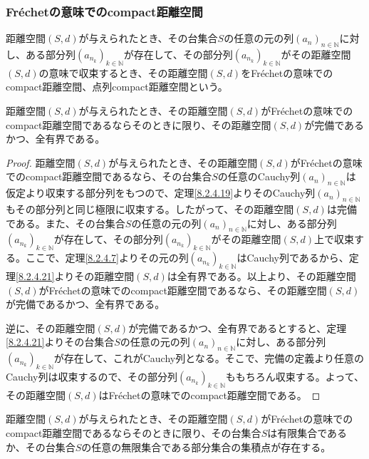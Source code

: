 \documentclass[dvipdfmx]{jsarticle}
\begin{document}
\subsubsection{Fréchetの意味でのcompact距離空間}%
\begin{dfn}
距離空間$(S,d)$が与えられたとき、その台集合$S$の任意の元の列$\left( a_{n} \right)_{n \in \mathbb{N}}$に対し、ある部分列$\left( a_{n_{k}} \right)_{k \in \mathbb{N}}$が存在して、その部分列$\left( a_{n_{k}} \right)_{k \in \mathbb{N}}$がその距離空間$(S,d)$の意味で収束するとき、その距離空間$(S,d)$をFréchetの意味でのcompact距離空間、点列compact距離空間という。
\end{dfn}
\begin{thm}\label{8.2.5.12}
距離空間$(S,d)$が与えられたとき、その距離空間$(S,d)$がFréchetの意味でのcompact距離空間であるならそのときに限り、その距離空間$(S,d)$が完備であるかつ、全有界である。
\end{thm}
\begin{proof}
距離空間$(S,d)$が与えられたとき、その距離空間$(S,d)$がFréchetの意味でのcompact距離空間であるなら、その台集合$S$の任意のCauchy列$\left( a_{n} \right)_{n \in \mathbb{N}}$は仮定より収束する部分列をもつので、定理\ref{8.2.4.19}よりそのCauchy列$\left( a_{n} \right)_{n \in \mathbb{N}}$もその部分列と同じ極限に収束する。したがって、その距離空間$(S,d)$は完備である。また、その台集合$S$の任意の元の列$\left( a_{n} \right)_{n \in \mathbb{N}}$に対し、ある部分列$\left( a_{n_{k}} \right)_{k \in \mathbb{N}}$が存在して、その部分列$\left( a_{n_{k}} \right)_{k \in \mathbb{N}}$がその距離空間$(S,d)$上で収束する。ここで、定理\ref{8.2.4.7}よりその元の列$\left( a_{n_{k}} \right)_{k \in \mathbb{N}}$はCauchy列であるから、定理\ref{8.2.4.21}よりその距離空間$(S,d)$は全有界である。以上より、その距離空間$(S,d)$がFréchetの意味でのcompact距離空間であるなら、その距離空間$(S,d)$が完備であるかつ、全有界である。\par
逆に、その距離空間$(S,d)$が完備であるかつ、全有界であるとすると、定理\ref{8.2.4.21}よりその台集合$S$の任意の元の列$\left( a_{n} \right)_{n \in \mathbb{N}}$に対し、ある部分列$\left( a_{n_{k}} \right)_{k \in \mathbb{N}}$が存在して、これがCauchy列となる。そこで、完備の定義より任意のCauchy列は収束するので、その部分列$\left( a_{n_{k}} \right)_{k \in \mathbb{N}}$ももちろん収束する。よって、その距離空間$(S,d)$はFréchetの意味でのcompact距離空間である。
\end{proof}
\begin{thm}\label{8.2.5.13}
距離空間$(S,d)$が与えられたとき、その距離空間$(S,d)$がFréchetの意味でのcompact距離空間であるならそのときに限り、その台集合$S$は有限集合であるか、その台集合$S$の任意の無限集合である部分集合の集積点が存在する。
\end{thm}
\end{document}

